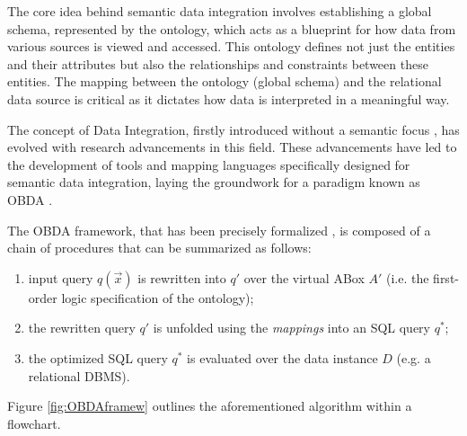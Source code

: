 The core idea behind semantic data integration involves establishing a global schema, represented by the ontology, which acts as a blueprint for how data from various sources is viewed and accessed. This ontology defines not just the entities and their attributes but also the relationships and constraints between these entities. The mapping between the ontology (global schema) and the relational data source is critical as it dictates how data is interpreted in a meaningful way.

The concept of Data Integration, firstly introduced without a semantic focus \cite{DBLP:conf/pods/Lenzerini02}, has evolved with research advancements in this field. These advancements have led to the development of tools and mapping languages specifically designed for semantic data integration, laying the groundwork for a paradigm known as \ac{OBDA} \cite{DBLP:conf/ijcai/XiaoCKLPRZ18}.

The \ac{OBDA} framework, that has been precisely formalized \cite{DBLP:conf/aiia/BotoevaCCCX18}, is composed of a chain of procedures that can be summarized as follows:
\begin{enumerate}
    \item input query ${q(\vec{x})}$ is rewritten \cite{DBLP:conf/otm/MakrisGBC10} into ${q'}$ over the virtual ABox ${A'}$ (i.e. the first-order logic specification of the ontology);
    \item the rewritten query ${q'}$ is unfolded using the \textit{mappings} into an \ac{SQL} query ${q^*}$;
    \item the optimized \ac{SQL} query ${q^*}$ is evaluated over the data instance ${D}$ (e.g. a relational \ac{DBMS}).
\end{enumerate}

Figure \ref{fig:OBDAframew} outlines the aforementioned algorithm within a flowchart.

